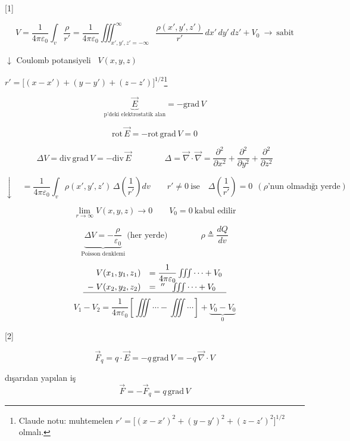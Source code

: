\documentclass[11pt,a4paper]{article}
\begin{document}

[1]

\[
V=\frac{1}{4\pi\varepsilon_0}\int_{v}\frac{\rho}{r'}
=\frac{1}{4\pi\varepsilon_0}\iiint_{x',y',z'=-\infty}^{\infty}\frac{\rho(x',y',z')}{r'}\,dx'\,dy'\,dz'+V_0
\ \rightarrow\ \text{sabit}
\]

$\downarrow$ Coulomb potansiyeli \ $V(x,y,z)$

\begin{center}
$\displaystyle r'=\bigl[(x-x')+(y-y')+(z-z')\bigr]^{1/2}$\footnote{Claude notu: muhtemelen $r'=\bigl[(x-x')^2+(y-y')^2+(z-z')^2\bigr]^{1/2}$ olmalı.}
\end{center}

\[
\underbrace{\vec E}_{\text{p'deki elektrostatik alan}}=-\mathrm{grad}\,V
\]

\[
\mathrm{rot}\,\vec E=-\mathrm{rot}\,\mathrm{grad}\,V=0
\]

\[
\Delta V=\mathrm{div}\,\mathrm{grad}\,V=-\mathrm{div}\,\vec E
\qquad\qquad
\Delta=\vec\nabla\cdot\vec\nabla=\frac{\partial^2}{\partial x^2}+\frac{\partial^2}{\partial y^2}+\frac{\partial^2}{\partial z^2}
\]

\[
\downarrow\quad
=\frac{1}{4\pi\varepsilon_0}\int_{v}\rho(x',y',z')\,\Delta\!\left(\frac{1}{r'}\right)dv
\qquad r'\neq 0\ \text{ise}\quad \Delta\!\left(\frac{1}{r'}\right)=0\ \ (\rho\text{'nun olmadığı yerde})
\]

\[
\lim_{r\to\infty}V(x,y,z)\to 0 \qquad V_0=0\ \text{kabul edilir}
\]

\[
\underbrace{\Delta V=-\frac{\rho}{\varepsilon_0}}_{\text{Poisson denklemi}}\ \text{(her yerde)}
\qquad\qquad
\rho\triangleq\frac{dQ}{dv}
\]

\[
\begin{array}{rl}
V(x_1,y_1,z_1)&=\dfrac{1}{4\pi\varepsilon_0}\iiint\cdots+V_0\\
-\;V(x_2,y_2,z_2)&=\ ''\ \ \iiint\cdots+V_0\\ \hline
\end{array}
\]
\[
V_1-V_2=\frac{1}{4\pi\varepsilon_0}\left[\iiint\cdots-\iiint\cdots\right]+\underbrace{V_0-V_0}_{0}
\]

[2]

\[
\vec F_q=q\cdot\vec E=-q\,\mathrm{grad}\,V=-q\,\vec\nabla\cdot V
\]

{\color{kirmizikalem}dışarıdan yapılan iş}
\[
\vec F=-\vec F_q=q\,\mathrm{grad}\,V
\]
\end{document}
